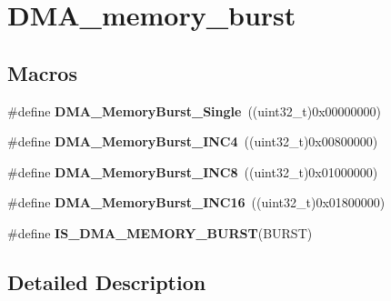 \hypertarget{group___d_m_a__memory__burst}{\section{D\-M\-A\-\_\-memory\-\_\-burst}
\label{group___d_m_a__memory__burst}
}
\subsection*{Macros}
\begin{DoxyCompactItemize}
\item 
\hypertarget{group___d_m_a__memory__burst_gab3353b3a85b555f826fe567ce68c3fc3}{\#define {\bfseries D\-M\-A\-\_\-\-Memory\-Burst\-\_\-\-Single}~((uint32\-\_\-t)0x00000000)}\label{group___d_m_a__memory__burst_gab3353b3a85b555f826fe567ce68c3fc3}

\item 
\hypertarget{group___d_m_a__memory__burst_gacf7f57731c663fdc6ca8a6fb18ff31b0}{\#define {\bfseries D\-M\-A\-\_\-\-Memory\-Burst\-\_\-\-I\-N\-C4}~((uint32\-\_\-t)0x00800000)}\label{group___d_m_a__memory__burst_gacf7f57731c663fdc6ca8a6fb18ff31b0}

\item 
\hypertarget{group___d_m_a__memory__burst_ga33aca825c5a81e83753ff6fadb3634c0}{\#define {\bfseries D\-M\-A\-\_\-\-Memory\-Burst\-\_\-\-I\-N\-C8}~((uint32\-\_\-t)0x01000000)}\label{group___d_m_a__memory__burst_ga33aca825c5a81e83753ff6fadb3634c0}

\item 
\hypertarget{group___d_m_a__memory__burst_ga4ffd4960f794b187229fac1cea3d81c9}{\#define {\bfseries D\-M\-A\-\_\-\-Memory\-Burst\-\_\-\-I\-N\-C16}~((uint32\-\_\-t)0x01800000)}\label{group___d_m_a__memory__burst_ga4ffd4960f794b187229fac1cea3d81c9}

\item 
\#define {\bfseries I\-S\-\_\-\-D\-M\-A\-\_\-\-M\-E\-M\-O\-R\-Y\-\_\-\-B\-U\-R\-S\-T}(B\-U\-R\-S\-T)
\end{DoxyCompactItemize}


\subsection{Detailed Description}


